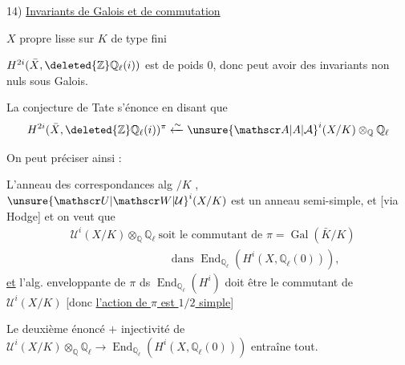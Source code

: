 14) \uline{Invariants de Galois et  de commutation}

$X$ propre lisse sur $K$ de type fini

$H^{2i}(\bar X,\deleted{\mathbb Z}\mathbb Q_\ell(i))$ est de poids $0$, donc peut avoir des invariants non nuls sous Galois.

La conjecture de Tate s'énonce en disant que
\[
H^{2i}(\bar X,\deleted{\mathbb Z}\mathbb Q_\ell(i))^\pi
\xleftarrow{\sim}\unsure{\mathscr A|A|\mathcal A}^{i}(X/K)\otimes_{\mathbb Q}\mathbb Q_\ell
\]

On peut  préciser ainsi :

L'anneau des correspondances alg $/K$ ,   $\unsure{\mathscr U|\mathscr W|\mathcal U}^i(X/K)$ est un anneau semi-simple, et [via Hodge] et on veut que
\[
\begin{aligned}
&\mathscr U^i(X/K)\otimes_{\mathbb Q}\mathbb Q_\ell\ \text{soit le commutant de }\pi=\operatorname{Gal}(\bar K/K)\\
&\hspace{9em}\text{dans }\operatorname{End}_{\mathbb Q_\ell}(H^i(X,\mathbb Q_\ell(0))),
\end{aligned}
\]
\uline{et} l'alg. enveloppante de $\pi$ ds $\operatorname{End}_{\mathbb Q_\ell}(H^i)$ doit être le commutant de $\mathscr U^i(X/K)$ [donc \uline{l'action de $\pi$ est $1/2$ simple}]

Le deuxième énoncé $+$ injectivité de $\mathscr U^i(X/K)\otimes_{\mathbb Q}\mathbb Q_\ell \longrightarrow\operatorname{End}_{\mathbb Q_\ell}(H^i(X,\mathbb Q_\ell(0)))$ entraîne tout.

